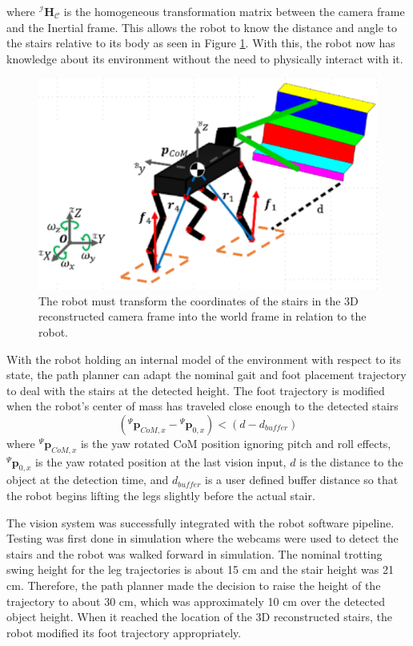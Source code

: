 where ${}^\mathcal{I}\bm{H}_\mathcal{C}$ is the homogeneous transformation matrix between the camera frame and the Inertial frame. This allows the robot to know the distance and angle to the stairs relative to its body as seen in Figure \ref{fig:RSR}. With this, the robot now has knowledge about its environment without the need to physically interact with it. 
\begin{figure}[!h]
\centering
\includegraphics[width=\columnwidth]{Figures/RobotStairsRelation.pdf}
\caption{The robot must transform the coordinates of the stairs in the 3D reconstructed camera frame into the world frame in relation to the robot.}
\label{fig:RSR}
\end{figure}
With the robot holding an internal model of the environment with respect to its state, the path planner can adapt the nominal gait and foot placement trajectory to deal with the stairs at the detected height. The foot trajectory is modified when the robot's center of mass has traveled close enough to the detected stairs
\begin{equation}
({}^\Psi\bm{p}_{CoM,x} - {}^\Psi\bm{p}_{0,x}) < (d - d_{buffer})
\end{equation}
where ${}^\Psi\bm{p}_{CoM,x}$ is the yaw rotated CoM position ignoring pitch and roll effects, ${}^\Psi\bm{p}_{0,x}$ is the yaw rotated position at the last vision input, $d$ is the distance to the object at the detection time, and $d_{buffer}$ is a user defined buffer distance so that the robot begins lifting the legs slightly before the actual stair.


The vision system was successfully integrated with the robot software pipeline. Testing was first done in simulation where the webcams were used to detect the stairs and the robot was walked forward in simulation. The nominal trotting swing height for the leg trajectories is about 15 cm and the stair height was 21 cm. Therefore, the path planner made the decision to raise the height of the trajectory to about 30 cm, which was approximately 10 cm over the detected object height. When it reached the location of the 3D reconstructed stairs, the robot modified its foot trajectory appropriately. 

